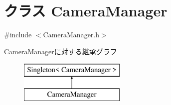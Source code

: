 \hypertarget{class_camera_manager}{\section{クラス Camera\-Manager}
\label{class_camera_manager}
}


{\ttfamily \#include $<$Camera\-Manager.\-h$>$}

Camera\-Managerに対する継承グラフ\begin{figure}[H]
\begin{center}
\leavevmode
\includegraphics[height=2.000000cm]{d2/d23/class_camera_manager}
\end{center}
\end{figure}
